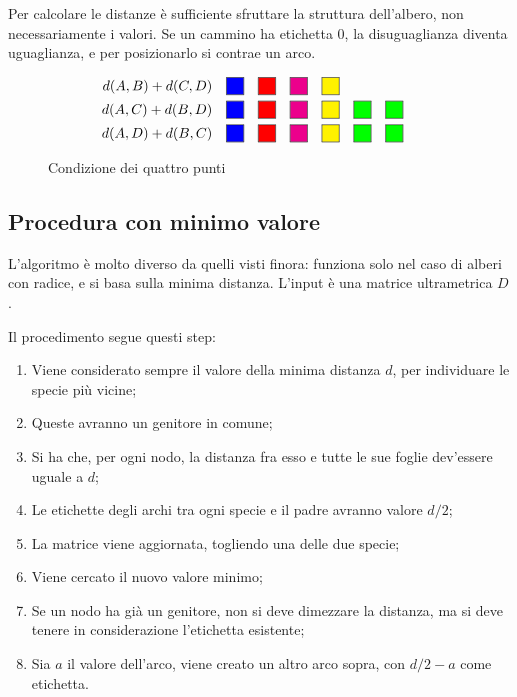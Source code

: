 Per calcolare le distanze è sufficiente sfruttare la struttura dell'albero, non necessariamente i valori. Se un cammino ha etichetta 0, la disuguaglianza diventa uguaglianza, e per posizionarlo si contrae un arco.

\begin{figure}
	\caption{Condizione dei quattro punti}
	\centering
	
	\begin{align*}
	d(A, B) + d(C, D) & \quad \coloredbox{blue} \coloredbox{red} \coloredbox{magenta} \coloredbox{yellow} \\
	d(A, C) + d(B, D) & \quad \coloredbox{blue} \coloredbox{red} \coloredbox{magenta} \coloredbox{yellow} \coloredbox{green} \coloredbox{green} \\
	d(A, D) + d(B, C) & \quad \coloredbox{blue} \coloredbox{red} \coloredbox{magenta} \coloredbox{yellow} \coloredbox{green} \coloredbox{green}
	\end{align*}
\end{figure}

\subsection{Procedura con minimo valore}
L'algoritmo è molto diverso da quelli visti finora: funziona solo nel caso di alberi con radice, e si basa sulla minima distanza. L'input è una matrice ultrametrica $D$.

Il procedimento segue questi step:
\begin{enumerate}
	\item Viene considerato sempre il valore della minima distanza $d$, per individuare le specie più vicine;
	\item Queste avranno un genitore in comune;
	\item Si ha che, per ogni nodo, la distanza fra esso e tutte le sue foglie dev'essere uguale a $d$;
	\item Le etichette degli archi tra ogni specie e il padre avranno valore $d/2$;
	\item La matrice viene aggiornata, togliendo una delle due specie;
	\item Viene cercato il nuovo valore minimo;
	\item Se un nodo ha già un genitore, non si deve dimezzare la distanza, ma si deve tenere in considerazione l'etichetta esistente;
	\item Sia $a$ il valore dell'arco, viene creato un altro arco sopra, con $d/2-a$ come etichetta.
\end{enumerate}

